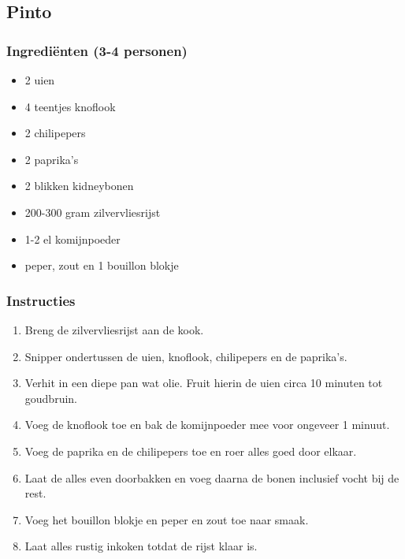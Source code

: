 \subsection{Pinto}

\subsubsection*{Ingrediënten (3-4 personen)}
\begin{multicols}{2}
    \begin{itemize}
        \item 2 uien
        \item 4 teentjes knoflook
        \item 2 chilipepers
        \item 2 paprika's
        \item 2 blikken kidneybonen
        \item 200-300 gram zilvervliesrijst
        \item 1-2 el komijnpoeder
        \item peper, zout en 1 bouillon blokje
    \end{itemize}
\end{multicols}

\subsubsection*{Instructies}
\begin{enumerate}
    \item Breng de zilvervliesrijst aan de kook.
    \item Snipper ondertussen de uien, knoflook, chilipepers en de paprika's.
    \item Verhit in een diepe pan wat olie. Fruit hierin de uien circa 10 minuten tot goudbruin.
    \item Voeg de knoflook toe en bak de komijnpoeder mee voor ongeveer 1 minuut.
    \item Voeg de paprika en de chilipepers toe en roer alles goed door elkaar.
    \item Laat de alles even doorbakken en voeg daarna de bonen inclusief vocht bij de rest.
    \item Voeg het bouillon blokje en peper en zout toe naar smaak.
    \item Laat alles rustig inkoken totdat de rijst klaar is.
\end{enumerate}